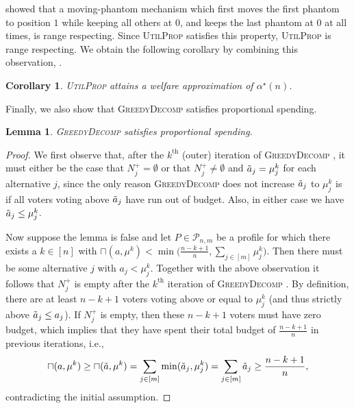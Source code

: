 \documentclass[11pt]{article}
\newcommand{\overlap}[2]{\sqcap(#1, #2)}
\newcommand{\UtP}{\textsc{UtilProp} }
\newcommand{\GrdDec}{\textsc{GreedyDecomp} }
\newtheorem{lemma}{Lemma}
\newtheorem{corollary}{Corollary}
\begin{document}
\smallskip

\citet{freeman2021truthful} showed that a moving-phantom mechanism which first moves the first phantom to position $1$ while keeping all others at $0$, and keeps the last phantom at $0$ at all times, is range respecting. Since \UtP satisfies this property, \UtP is range respecting.
We obtain the following corollary by combining this observation, .%




\smallskip

\begin{corollary} \label{cor:util_prop_welfare_approximation}
    \UtP attains a welfare approximation of $\alpha^\star(n)$. %
\end{corollary}

\smallskip

Finally, we also show that \GrdDec satisfies proportional spending.

\smallskip

\begin{lemma} \label{lem:GrdDec_lower_bound}
    \GrdDec satisfies proportional spending.
\end{lemma}

\begin{proof}
    We first observe that, after the $k^\text{th}$ (outer) iteration of \GrdDec, it must either be the case that $N_j^+ = \emptyset$ or that $N_j^+ \neq \emptyset$ and $\Tilde{a}_j = \mu^k_j$ for each alternative $j$, since the only reason \GrdDec does not increase $\Tilde{a}_j$ to $\mu^k_j$ is if all voters voting above $\Tilde{a}_j$ have run out of budget. Also, in either case we have $\Tilde{a}_j \le \mu^k_j$.

    Now suppose the lemma is false and let $P \in \mathcal{P}_{n,m}$ be a profile for which there exists a $k \in [n]$ with $\overlap{a}{\mu^k} < \min\big( \frac{n-k+1}{n}, \sum_{j \in [m]} \mu^k_j \big)$. Then there must be some alternative $j$ with $a_j < \mu^k_j$. Together with the above observation it follows that $N_j^+$ is empty after the $k^\text{th}$ iteration of \GrdDec.
    By definition, there are at least $n-k+1$ voters voting above or equal to $\mu^k_j$ (and thus strictly above $\Tilde{a}_j \le a_j$). If $N_j^+$ is empty, then these $n-k+1$ voters must have zero budget, which implies that they have spent their total budget of $\frac{n-k+1}{n}$ in previous iterations, i.e., $$\overlap{a}{\mu^k} \ge \overlap{\Tilde{a}}{\mu^k} = \sum_{j\in [m]} \min(\Tilde{a}_j, \mu^k_j) = \sum_{j \in [m]} \Tilde{a}_j \ge \frac{n-k+1}{n},$$ contradicting the initial assumption.
\end{proof}
\end{document}

